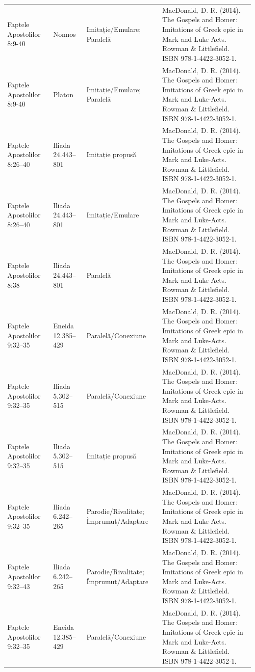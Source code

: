 \documentclass[12pt,a4paper,twoside,openany]{book}
\begin{document}
\begin{longtable}{L{1.4cm}L{1.7cm}L{3.1cm}L{8.4cm}}
Faptele Apostolilor 8:9-40 & Nonnos & Imitație/Emulare; Paralelă & MacDonald, D. R. (2014). The Gospels and Homer: Imitations of Greek epic in Mark and Luke-Acts. Rowman \& Littlefield. ISBN 978-1-4422-3052-1. \\
Faptele Apostolilor 8:9-40 & Platon & Imitație/Emulare; Paralelă & MacDonald, D. R. (2014). The Gospels and Homer: Imitations of Greek epic in Mark and Luke-Acts. Rowman \& Littlefield. ISBN 978-1-4422-3052-1. \\
Faptele Apostolilor 8:26–40 & Iliada 24.443–801 & Imitație propusă & MacDonald, D. R. (2014). The Gospels and Homer: Imitations of Greek epic in Mark and Luke-Acts. Rowman \& Littlefield. ISBN 978-1-4422-3052-1. \\
Faptele Apostolilor 8:26–40 & Iliada 24.443–801 & Imitație/Emulare & MacDonald, D. R. (2014). The Gospels and Homer: Imitations of Greek epic in Mark and Luke-Acts. Rowman \& Littlefield. ISBN 978-1-4422-3052-1. \\
Faptele Apostolilor 8:38 & Iliada 24.443–801 & Paralelă & MacDonald, D. R. (2014). The Gospels and Homer: Imitations of Greek epic in Mark and Luke-Acts. Rowman \& Littlefield. ISBN 978-1-4422-3052-1. \\
Faptele Apostolilor 9:32–35 & Eneida 12.385–429 & Paralelă/Conexiune & MacDonald, D. R. (2014). The Gospels and Homer: Imitations of Greek epic in Mark and Luke-Acts. Rowman \& Littlefield. ISBN 978-1-4422-3052-1. \\
Faptele Apostolilor 9:32–35 & Iliada 5.302–515 & Paralelă/Conexiune & MacDonald, D. R. (2014). The Gospels and Homer: Imitations of Greek epic in Mark and Luke-Acts. Rowman \& Littlefield. ISBN 978-1-4422-3052-1. \\
Faptele Apostolilor 9:32–35 & Iliada 5.302–515 & Imitație propusă & MacDonald, D. R. (2014). The Gospels and Homer: Imitations of Greek epic in Mark and Luke-Acts. Rowman \& Littlefield. ISBN 978-1-4422-3052-1. \\
Faptele Apostolilor 9:32–35 & Iliada 6.242–265 & Parodie/Rivalitate; Împrumut/Adaptare & MacDonald, D. R. (2014). The Gospels and Homer: Imitations of Greek epic in Mark and Luke-Acts. Rowman \& Littlefield. ISBN 978-1-4422-3052-1. \\
Faptele Apostolilor 9:32–43 & Iliada 6.242–265 & Parodie/Rivalitate; Împrumut/Adaptare & MacDonald, D. R. (2014). The Gospels and Homer: Imitations of Greek epic in Mark and Luke-Acts. Rowman \& Littlefield. ISBN 978-1-4422-3052-1. \\
Faptele Apostolilor 9:32–35 & Eneida 12.385–429 & Paralelă/Conexiune & MacDonald, D. R. (2014). The Gospels and Homer: Imitations of Greek epic in Mark and Luke-Acts. Rowman \& Littlefield. ISBN 978-1-4422-3052-1. \\

\end{longtable}
\end{document}
